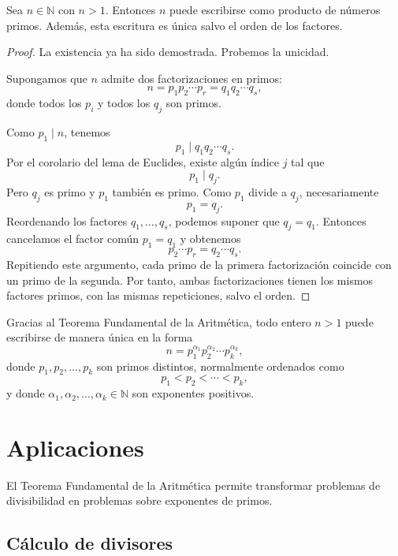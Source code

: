 \begin{teorema}
Sea \(n\in\mathbb{N}\) con \(n>1\). Entonces \(n\) puede escribirse como producto de números primos. Además, esta escritura es única salvo el orden de los factores.
\end{teorema}

\begin{proof}
La existencia ya ha sido demostrada. Probemos la unicidad.

Supongamos que \(n\) admite dos factorizaciones en primos:
\[
  n=p_1p_2\cdots p_r=q_1q_2\cdots q_s,
\]
donde todos los \(p_i\) y todos los \(q_j\) son primos.

Como \(p_1\mid n\), tenemos
\[
  p_1\mid q_1q_2\cdots q_s.
\]
Por el corolario del lema de Euclides, existe algún índice \(j\) tal que
\[
  p_1\mid q_j.
\]
Pero \(q_j\) es primo y \(p_1\) también es primo. Como \(p_1\) divide a \(q_j\), necesariamente
\[
  p_1=q_j.
\]
Reordenando los factores \(q_1,\ldots,q_s\), podemos suponer que \(q_j=q_1\). Entonces cancelamos el factor común \(p_1=q_1\) y obtenemos
\[
  p_2\cdots p_r=q_2\cdots q_s.
\]
Repitiendo este argumento, cada primo de la primera factorización coincide con un primo de la segunda. Por tanto, ambas factorizaciones tienen los mismos factores primos, con las mismas repeticiones, salvo el orden.
\end{proof}

\begin{convencion}
Gracias al Teorema Fundamental de la Aritmética, todo entero \(n>1\) puede escribirse de manera única en la forma
\[
  n=p_1^{\alpha_1}p_2^{\alpha_2}\cdots p_k^{\alpha_k},
\]
donde \(p_1,p_2,\ldots,p_k\) son primos distintos, normalmente ordenados como
\[
  p_1<p_2<\cdots<p_k,
\]
y donde \(\alpha_1,\alpha_2,\ldots,\alpha_k\in\mathbb{N}\) son exponentes positivos.
\end{convencion}

\section{Aplicaciones}

El Teorema Fundamental de la Aritmética permite transformar problemas de divisibilidad en problemas sobre exponentes de primos.

\subsection*{Cálculo de divisores}

